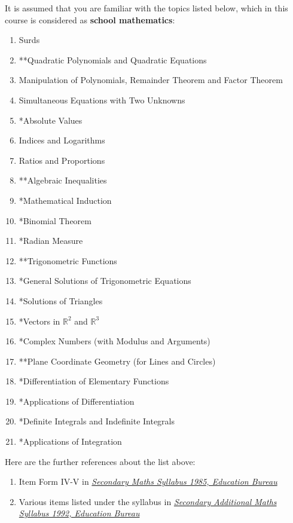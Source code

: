 \documentclass[a4paper,12pt]{article}
\newcommand{\R}{\mathbb{R}}
\newenvironment{alist}{ %
\begin{enumerate}[label=(\alph*)]
}{
\end{enumerate}
}
\newenvironment{Alist}{ %
\begin{enumerate}[label=(\Alph*)]
}{
\end{enumerate}
}
\begin{document}
It is assumed that you are familiar with the topics listed below, which in this course is considered as \textbf{school mathematics}:
\begin{alist}
  \item Surds
  \item **Quadratic Polynomials and Quadratic Equations
  \item Manipulation of Polynomials, Remainder Theorem and Factor Theorem
  \item Simultaneous Equations with Two Unknowns
  \item *Absolute Values
  \item Indices and Logarithms
  \item Ratios and Proportions
  \item **Algebraic Inequalities
  \item *Mathematical Induction
  \item *Binomial Theorem
  \item *Radian Measure
  \item **Trigonometric Functions
  \item *General Solutions of Trigonometric Equations
  \item *Solutions of Triangles
  \item *Vectors in $\R^{2}$ and $\R^{3}$
  \item *Complex Numbers (with Modulus and Arguments)
  \item **Plane Coordinate Geometry (for Lines and Circles)
  \item *Differentiation of Elementary Functions
  \item *Applications of Differentiation
  \item *Definite Integrals and Indefinite Integrals
  \item *Applications of Integration
\end{alist}
\pagebreak

Here are the further references about the list above:
\begin{Alist}
  \item Item Form IV-V in \href{https://www.edb.gov.hk/en/curriculum-development/kla/ma/curr/sec-math-1985.html}{\textit{Secondary Maths Syllabus 1985, Education Bureau}}
  \item Various items listed under the syllabus in \href{http://www.edb.gov.hk/en/curriculum-development/kla/ma/curr/add-math-1992.html}{\textit{Secondary Additional Maths Syllabus 1992, Education Bureau}}
\end{Alist}
\end{document}
